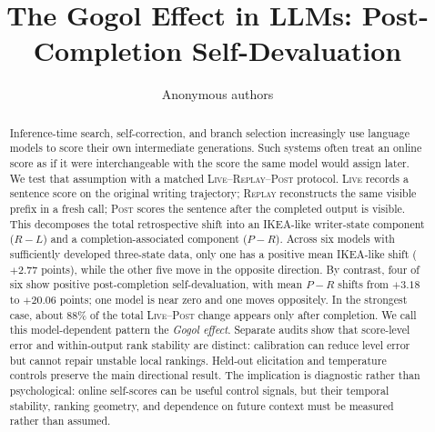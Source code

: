 \documentclass{article}
\title{The Gogol Effect in LLMs: Post-Completion Self-Devaluation}
\author{Anonymous authors}
\newcommand{\live}{\textsc{Live}}
\newcommand{\replay}{\textsc{Replay}}
\newcommand{\post}{\textsc{Post}}
\begin{document}
\maketitle

\begin{abstract}
Inference-time search, self-correction, and branch selection increasingly use language models to score their own intermediate generations. Such systems often treat an online score as if it were interchangeable with the score the same model would assign later. We test that assumption with a matched \live{}--\replay{}--\post{} protocol. \live{} records a sentence score on the original writing trajectory; \replay{} reconstructs the same visible prefix in a fresh call; \post{} scores the sentence after the completed output is visible. This decomposes the total retrospective shift into an IKEA-like writer-state component ($R-L$) and a completion-associated component ($P-R$). Across six models with sufficiently developed three-state data, only one has a positive mean IKEA-like shift ($+2.77$ points), while the other five move in the opposite direction. By contrast, four of six show positive post-completion self-devaluation, with mean $P-R$ shifts from $+3.18$ to $+20.06$ points; one model is near zero and one moves oppositely. In the strongest case, about 88\% of the total \live{}--\post{} change appears only after completion. We call this model-dependent pattern the \emph{Gogol effect}. Separate audits show that score-level error and within-output rank stability are distinct: calibration can reduce level error but cannot repair unstable local rankings. Held-out elicitation and temperature controls preserve the main directional result. The implication is diagnostic rather than psychological: online self-scores can be useful control signals, but their temporal stability, ranking geometry, and dependence on future context must be measured rather than assumed.
\end{abstract}






\end{document}
